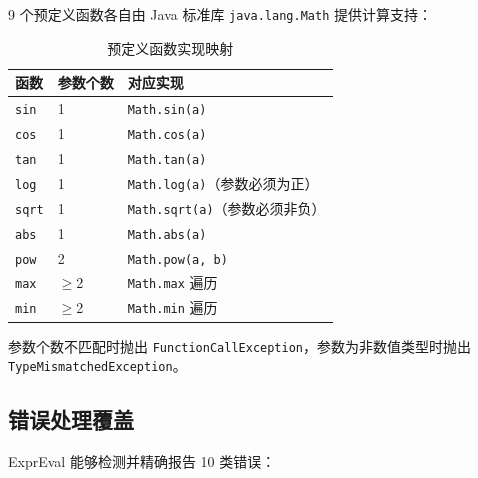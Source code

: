 \documentclass[a4paper]{article}
\begin{document}
9 个预定义函数各自由 Java 标准库 \texttt{java.lang.Math} 提供计算支持：

\begin{table}[H]
\centering
\caption{预定义函数实现映射}
\begin{tabular}{@{}lll@{}}
\toprule
\textbf{函数} & \textbf{参数个数} & \textbf{对应实现} \\
\midrule
\texttt{sin} & 1 & \texttt{Math.sin(a)} \\
\texttt{cos} & 1 & \texttt{Math.cos(a)} \\
\texttt{tan} & 1 & \texttt{Math.tan(a)} \\
\texttt{log} & 1 & \texttt{Math.log(a)}（参数必须为正） \\
\texttt{sqrt} & 1 & \texttt{Math.sqrt(a)}（参数必须非负） \\
\texttt{abs} & 1 & \texttt{Math.abs(a)} \\
\texttt{pow} & 2 & \texttt{Math.pow(a, b)} \\
\texttt{max} & $\geq$2 & \texttt{Math.max} 遍历 \\
\texttt{min} & $\geq$2 & \texttt{Math.min} 遍历 \\
\bottomrule
\end{tabular}
\label{tab:functions}
\end{table}

参数个数不匹配时抛出 \texttt{FunctionCallException}，参数为非数值类型时抛出 \texttt{TypeMismatchedException}。

\subsection{错误处理覆盖}

ExprEval 能够检测并精确报告 10 类错误：
\end{document}
